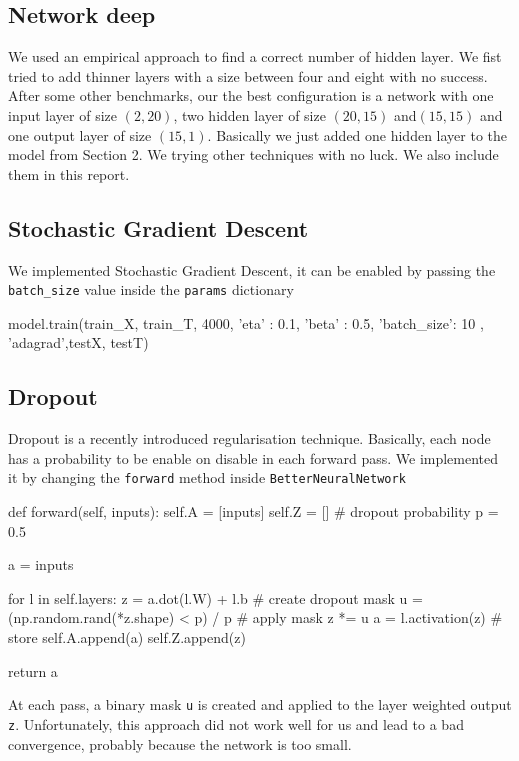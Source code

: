 \documentclass[11pt]{article}
\begin{document}
\subsection{Network deep}
We used an empirical approach to find a correct number of hidden layer. We fist tried to add thinner layers with a size between four and eight with no success. After some other benchmarks, our the best configuration is a network with one input layer of size $(2,20)$, two hidden layer of size $(20,15)$ and$(15,15)$ and one output layer of size $(15,1)$. Basically we just added one hidden layer to the model from Section 2.
We trying other techniques with no luck. We also include them in this report.
\subsection{Stochastic Gradient Descent}
We implemented Stochastic Gradient Descent, it can be enabled by passing the \texttt{batch\_size} value inside the \texttt{params} dictionary

\begin{python}
model.train(train_X, train_T, 4000, { 'eta' : 0.1, 'beta' : 0.5, 'batch_size': 10 }, 'adagrad',testX, testT)	
\end{python}
\subsection{Dropout}
Dropout is a recently introduced regularisation technique. Basically, each node has a probability to be enable on disable in each forward pass. We implemented it by changing the \texttt{forward} method inside \texttt{BetterNeuralNetwork}
\begin{python}
    def forward(self, inputs):
        self.A = [inputs]
        self.Z = []
        # dropout probability
        p = 0.5
        
        a = inputs

        for l in self.layers:
            z = a.dot(l.W) + l.b
            # create dropout mask
            u = (np.random.rand(*z.shape) < p) / p
            # apply mask
            z *= u
            a = l.activation(z)
            # store
            self.A.append(a)
            self.Z.append(z)

        return a
\end{python}
At each pass, a binary mask \texttt{u} is created and applied to the layer weighted output \texttt{z}. Unfortunately, this approach did not work well for us and lead to a bad convergence, probably because the network is too small.
\end{document}
